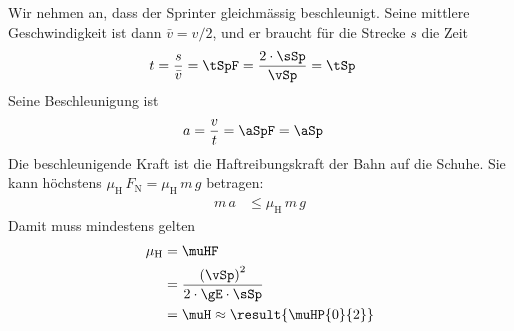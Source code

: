 Wir nehmen an, dass der Sprinter gleichmässig beschleunigt. Seine mittlere Geschwindigkeit ist dann $\bar v = v/2$, und er braucht für die Strecke $s$ die Zeit
\begin{align}
 t &= \frac{s}{\bar v} = \tSpF = \frac{2\cdot\sSp}{\vSp} = \tSp
\end{align}
Seine Beschleunigung ist
\begin{align}
 a &= \frac{v}{t} = \aSpF = \aSp
\end{align}
Die beschleunigende Kraft ist die Haftreibungskraft der Bahn auf die Schuhe. Sie kann höchstens $\mu_\mathrm{H}\,F_\mathrm{N} = \mu_\mathrm{H}\,m\,g$ betragen:
\begin{align}
 m\,a &\leq \mu_\mathrm{H}\,m\,g
\end{align}
Damit muss mindestens gelten
\begin{align}
 \mu_\mathrm{H} &= \muHF \\
   &= \frac{\left(\vSp\right)^2}{2\cdot\gE\cdot\sSp} \\
   &= \muH \approx \result{\muHP{0}{2}}
\end{align}
